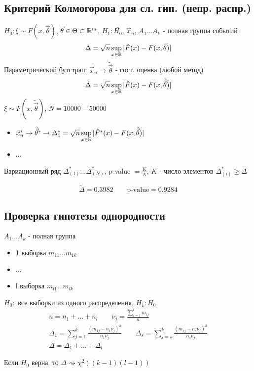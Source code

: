 \documentclass{article}
\begin{document}
\subsection{Критерий Колмогорова для сл. гип. (непр. распр.)}
$H_0: \xi \sim F(x, \vec{\theta})$, $\vec{\theta} \in \Theta \subset \mathbb{R}^{m}$,
$H_1:\bar{H_0}$, $\vec{x}_n$, $A_1\dots A_k$ - полная группа событий
\begin{gather*}
  \Delta = \sqrt{n}\sup \limits_{x\in \mathbb{R}}|\tilde{F}(x)-F(x, \vec{\theta})|
\end{gather*}
Параметрический бутстрап: $\vec{x}_n \rightarrow \tilde{\vec{\theta}}$ - сост. оценка (любой метод)
\begin{gather*}
  \tilde{\Delta} = \sqrt{n}\sup \limits_{x\in \mathbb{R}}|\tilde{F}(x)-F(x, \tilde{\vec{\theta}})|
\end{gather*}
$\xi \sim F(x, \tilde{\vec{\theta}})$, $N=10 0 0 0 - 50 0 0 0$
\begin{itemize}
  \item $\vec{x}_n^{*} \rightarrow \tilde{\vec{\theta}}^{*} \rightarrow \Delta_1^{*}=\sqrt{n}\sup \limits_{x\in\mathbb{R}}|\tilde{F}^{*}(x)-F(x, \tilde{\vec{\theta}})|$
  \item ...
\end{itemize}
Вариационный ряд $\Delta_{(1)}^{*}\dots \Delta_{(N)}^{*}$, p-value $=\frac{K}{N}$,
$K$ - число элементов $\Delta_{(i)}^{*} \ge \tilde{\Delta}$
\begin{eg}[Эрланг]
  \[
    \tilde{\Delta}=0.3982 \qquad \text{p-value}=0.9284
  \]
\end{eg}

\subsection{Проверка гипотезы однородности}
$A_1\dots A_{k}$ - полная группа
\begin{itemize}
  \item 1 выборка $m_{11}\dots m_{1k}$
  \item ...
  \item l выборка $m_{l1}\dots m_{lk}$
\end{itemize}
$H_0:$ все выборки из одного распределения, $H_1:\bar{H_0}$
\begin{gather*}
  n = n_1 + \dots  + n_l \qquad \nu_{j}=\frac{\sum_{i=1}^{l}m_{ij}}{n} \\ 
  \Delta_1=\sum_{j=1}^{k}\frac{(m_{1j}-n_1\nu_j)^{2}}{n_1\nu_j} \qquad
  \Delta_s=\sum_{j=s}^{k}\frac{(m_{sj}-n_s\nu_j)^{2}}{n_s\nu_j} \\ 
  \Delta = \Delta_1+ \dots + \Delta_l
\end{gather*}
\begin{theorem}
  Если $H_0$ верна, то $\Delta \rightsquigarrow \chi^{2}((k-1)(l-1))$
\end{theorem}
\end{document}
